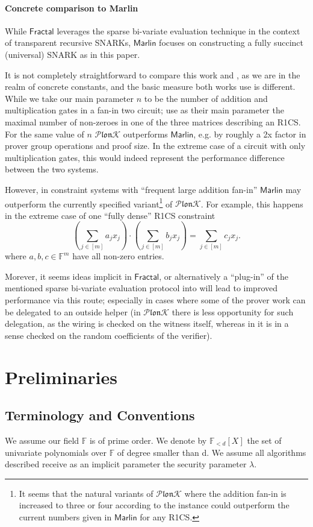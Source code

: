 \documentclass[11pt]{article} %
\newcommand{\plonk}{\ensuremath{\mathcal{P} \mathfrak{lon}\mathcal{K}}\xspace}
\newcommand{\F}{\ensuremath{\mathbb F}\xspace}
\newcommand{\polysofdeg}[1]{\ensuremath{\F_{< #1}[X]}\xspace}
\newcommand{\sumj}[1]{\sum_{j\in[#1]}}
\newcommand{\marlin}{\ensuremath{\mathsf{Marlin}}\xspace}
\newcommand{\fractal}{\ensuremath{\mathsf{Fractal}}\xspace}
\begin{document}
\paragraph{Concrete comparison to Marlin}
While \fractal leverages the sparse bi-variate evaluation technique in the context of transparent recursive SNARKs, \marlin focuses on constructing a fully succinct (universal) SNARK as in this paper.

It is not completely straightforward to compare this work and \cite{marlin}, as we are in 
the realm of concrete constants, and the basic measure both works use is different.
While we take our main parameter $n$ to be the number of addition and multiplication gates in a fan-in two circuit;
\cite{marlin} use as their main parameter the maximal number of non-zeroes in one of the three matrices describing an R1CS. For the same value of $n$ \plonk outperforms \marlin, e.g. by roughly a 2x factor in prover group operations and proof size.
In the extreme case of a circuit with only multiplication gates, this would indeed represent the performance difference between the two systems.

However, in constraint systems with ``frequent large addition fan-in'' \marlin may outperform the currently specified variant\footnote{It seems that the natural variants of \plonk where the addition fan-in is increased to three or four according to the instance could outperform the current numbers given in \marlin for any R1CS.} of \plonk.
For example, this happens in the extreme case of one ``fully dense'' R1CS constraint
\[\left(\sum_{j\in [m]} a_jx_j \right)\cdot \left( \sumj{m} b_jx_j\right) = \sumj{m}c_jx_j.\]
where $a,b,c\in \F^m$ have all non-zero entries.


Morever, it seems ideas implicit in \fractal, or alternatively a ``plug-in'' of the mentioned sparse bi-variate evaluation protocol into \cite{auroralight} will lead to improved performance via this route;
especially in cases where some of the prover work can be delegated to an outside helper (in \plonk there is less opportunity for such delegation, as the wiring is checked on the witness itself, whereas in \cite{auroralight,marlin,fractal} it is in a sense checked on the random coefficients of the verifier).

\section{Preliminaries}


\subsection{Terminology and Conventions}\label{sec:terminology}
We assume our field \F is of prime order.
We denote by \polysofdeg{d} the set of univariate polynomials over \F of degree smaller than d. 
We assume all algorithms described receive as an implicit parameter the security parameter $\lambda$.
\end{document}
